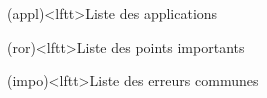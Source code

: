 \documentclass[../../main/main.tex]{subfiles}
\begin{document}
\begin{boxes}
	\begin{tcb}(appl)<lftt>{Liste des applications}
	\end{tcb}
	\begin{tcb}(ror)<lftt>{Liste des points importants}
	\end{tcb}
	\begin{tcb}(impo)<lftt>{Liste des erreurs communes}
	\end{tcb}
\end{boxes}
\vspace*{\fill}
\end{document}
